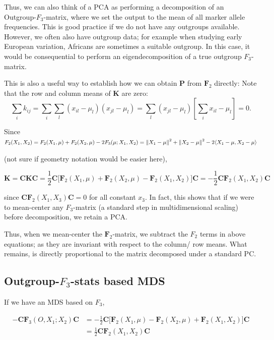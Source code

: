 \documentclass[10pt,a4paper]{article}
\newcommand{\normsq}[1]{\left\lVert#1\right\rVert^2}
\newcommand{\MC}{\mathbf{C}} %
\newcommand{\MF}{\mathbf{F}_2} %
\newcommand{\MFT}{\mathbf{F}_3} %
\newcommand{\MP}{\mathbf{P}} %
\newcommand{\MK}{\mathbf{K}} %
\begin{document}
	
	
	Thus, we can also think of a PCA as performing a decomposition of an Outgroup-$F_3$-matrix, where we set the output to the mean of all marker allele frequencies. This is good practice if we do not have any outgroups available. However, we often also have outgroup data; for example when studying early European variation, Africans are sometimes a suitable outgroup. In this case, it would be consequential to perform an eigendecomposition of a true outgroup $F_3$-matrix.
	

	
	
This is also a useful way to establish how we can obtain $\MP$ from $\MF$ directly: Note that the row and column means of $\MK$ are zero:
\begin{equation*}
\sum_i k_{ij}= \sum_i\sum_l (x_{il}-\mu_l)(x_{jl} - \mu_l)= \sum_l(x_{jl} - \mu_l)\left[\sum_i x_{il} -\mu_l\right] = 0 \text{.}
\end{equation*}

Since $F_2(X_1, X_2) = F_2(X_1, \mu) + F_2(X_2, \mu) - 2 F_3(\mu; X_1, X_2) \\= \normsq{X_1-\mu} + \normsq{X_2 - \mu} - 2\langle X_1 - \mu, X_2 - \mu \rangle$

(not sure if geometry notation would be easier here),

\begin{equation}
\MK = \MC\MK\MC = \frac{1}{2}\MC\big[\MF(X_1, \mu) + \MF(X_2, \mu) - \MF(X_1, X_2)\big]\MC=-\frac{1}{2} \MC \MF(X_1, X_2) \MC
\end{equation}

since $\MC\MF(X_1, X_3)\MC = 0$ for all constant $x_3$. In fact, this shows that if we were to mean-center any $F_3$-matrix (a standard step in multidimensional scaling) before decomposition, we retain a PCA.


Thus, when we mean-center the $\MF$-matrix, we subtract the $F_2$ terms in above equations; as they are invariant with respect to the column/ row means. What remains, is directly proportional to the matrix decomposed under a standard PC. 

\subsection{Outgroup-$F_3$-stats based MDS}
If we have an MDS based on $F_3$, 

\begin{align}
-\MC\MFT(O, X_1; X_2)\MC &= -\frac{1}{2}\MC\big[\MF(X_1, \mu) - \MF(X_2, \mu) + \MF(X_1, X_2)\big]\MC\\
&=\frac{1}{2} \MC \MF(X_1, X_2) \MC
\end{align}
\end{document}
